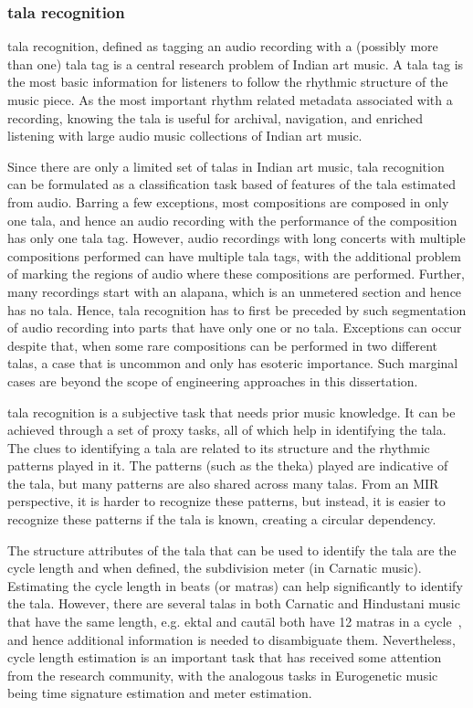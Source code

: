 \subsubsection{\Gls{tala} recognition}
\Gls{tala} recognition, defined as tagging an audio recording with a (possibly more than one) \gls{tala} tag is a central research problem of Indian art music. A \gls{tala} tag is the most basic information for listeners to follow the rhythmic structure of the music piece. As the most important rhythm related metadata associated with a recording, knowing the \gls{tala} is useful for archival, navigation, and enriched listening with large audio music collections of Indian art music. 

Since there are only a limited set of \glspl{tala} in Indian art music, \gls{tala} recognition can be formulated as a classification task based of features of the \gls{tala} estimated from audio. Barring a few exceptions, most compositions are composed in only one \gls{tala}, and hence an audio recording with the performance of the composition has only one \gls{tala} tag. However, audio recordings with long concerts with multiple compositions performed can have multiple \gls{tala} tags, with the additional problem of marking the regions of audio where these compositions are performed. Further, many recordings start with an \gls{alapana}, which is an unmetered section and hence has no \gls{tala}. Hence, \gls{tala} recognition has to first be preceded by such segmentation of audio recording into parts that have only one or no \gls{tala}. Exceptions can occur despite that, when some rare compositions can be performed in two different \glspl{tala}, a case that is uncommon and only has esoteric importance. Such marginal cases are beyond the scope of engineering approaches in this dissertation. 

\Gls{tala} recognition is a subjective task that needs prior music knowledge. It can be achieved through a set of proxy tasks, all of which help in identifying the \gls{tala}. The clues to identifying a \gls{tala} are related to its structure and the rhythmic patterns played in it. The patterns (such as the \gls{theka}) played are indicative of the \gls{tala}, but many patterns are also shared across many \glspl{tala}. From an \gls{MIR} perspective, it is harder to recognize these patterns, but instead, it is easier to recognize these patterns if the \gls{tala} is known, creating a circular dependency. 

The structure attributes of the \gls{tala} that can be used to identify the \gls{tala} are the cycle length and when defined, the subdivision meter (in Carnatic music). Estimating the cycle length in beats (or \glspl{matra}) can help significantly to identify the \gls{tala}. However, there are several \glspl{tala} in both Carnatic and Hindustani music that have the same length, e.g. \gls{ektal} and cautāl both have 12 \glspl{matra} in a cycle~\cite{clayton:00:time}, and hence additional information is needed to disambiguate them. Nevertheless, cycle length estimation is an important task that has received some attention from the research community, with the analogous tasks in Eurogenetic music being time signature estimation and meter estimation. 


